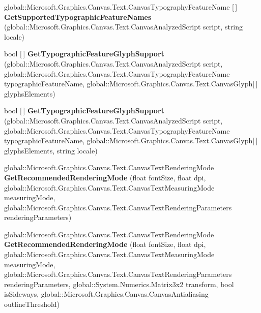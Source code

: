 \begin{DoxyCompactItemize}
global\+::\+Microsoft.\+Graphics.\+Canvas.\+Text.\+Canvas\+Typography\+Feature\+Name \mbox{[}$\,$\mbox{]} {\bfseries Get\+Supported\+Typographic\+Feature\+Names} (global\+::\+Microsoft.\+Graphics.\+Canvas.\+Text.\+Canvas\+Analyzed\+Script script, string locale)
\item 
\mbox{\label{interface_microsoft_1_1_graphics_1_1_canvas_1_1_text_1_1_i_canvas_font_face_a3ca04097c0081b708308456e13b4e899}} 
bool \mbox{[}$\,$\mbox{]} {\bfseries Get\+Typographic\+Feature\+Glyph\+Support} (global\+::\+Microsoft.\+Graphics.\+Canvas.\+Text.\+Canvas\+Analyzed\+Script script, global\+::\+Microsoft.\+Graphics.\+Canvas.\+Text.\+Canvas\+Typography\+Feature\+Name typographic\+Feature\+Name, global\+::\+Microsoft.\+Graphics.\+Canvas.\+Text.\+Canvas\+Glyph\mbox{[}$\,$\mbox{]} glyphs\+Elements)
\item 
\mbox{\label{interface_microsoft_1_1_graphics_1_1_canvas_1_1_text_1_1_i_canvas_font_face_a514a165ff64c3f1614b2f28786e28721}} 
bool \mbox{[}$\,$\mbox{]} {\bfseries Get\+Typographic\+Feature\+Glyph\+Support} (global\+::\+Microsoft.\+Graphics.\+Canvas.\+Text.\+Canvas\+Analyzed\+Script script, global\+::\+Microsoft.\+Graphics.\+Canvas.\+Text.\+Canvas\+Typography\+Feature\+Name typographic\+Feature\+Name, global\+::\+Microsoft.\+Graphics.\+Canvas.\+Text.\+Canvas\+Glyph\mbox{[}$\,$\mbox{]} glyphs\+Elements, string locale)
\item 
\mbox{\label{interface_microsoft_1_1_graphics_1_1_canvas_1_1_text_1_1_i_canvas_font_face_ae2ae5755a0eea0672afea0b62e974f44}} 
global\+::\+Microsoft.\+Graphics.\+Canvas.\+Text.\+Canvas\+Text\+Rendering\+Mode {\bfseries Get\+Recommended\+Rendering\+Mode} (float font\+Size, float dpi, global\+::\+Microsoft.\+Graphics.\+Canvas.\+Text.\+Canvas\+Text\+Measuring\+Mode measuring\+Mode, global\+::\+Microsoft.\+Graphics.\+Canvas.\+Text.\+Canvas\+Text\+Rendering\+Parameters rendering\+Parameters)
\item 
\mbox{\label{interface_microsoft_1_1_graphics_1_1_canvas_1_1_text_1_1_i_canvas_font_face_ad1b6a77bda7d882553aa0e86389e24c2}} 
global\+::\+Microsoft.\+Graphics.\+Canvas.\+Text.\+Canvas\+Text\+Rendering\+Mode {\bfseries Get\+Recommended\+Rendering\+Mode} (float font\+Size, float dpi, global\+::\+Microsoft.\+Graphics.\+Canvas.\+Text.\+Canvas\+Text\+Measuring\+Mode measuring\+Mode, global\+::\+Microsoft.\+Graphics.\+Canvas.\+Text.\+Canvas\+Text\+Rendering\+Parameters rendering\+Parameters, global\+::\+System.\+Numerics.\+Matrix3x2 transform, bool is\+Sideways, global\+::\+Microsoft.\+Graphics.\+Canvas.\+Canvas\+Antialiasing outline\+Threshold)

\end{DoxyCompactItemize}
